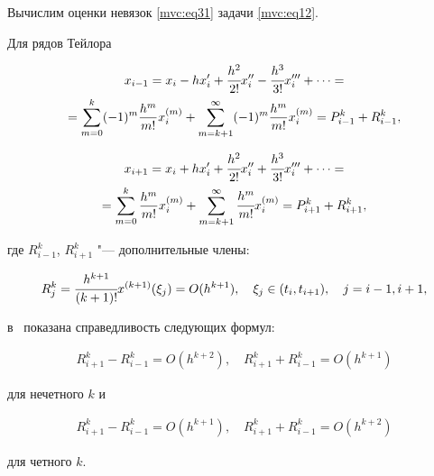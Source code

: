 Вычислим оценки невязок \eqref{mvc:eq31} задачи \eqref{mvc:eq12}.

Для рядов Тейлора

\begin{multline}

\label{mvc:eq47}

x_{i-1}=x_i-hx'_i+\cfrac{h^2}{2!} x''_i-\cfrac{h^3}{3!} x'''_i+\dots=

\\

= \sum_{m=0}^k(-1)^m\frac{h^m}{m!} x_i^{(m)}

+\sum_{m=k+1}^\infty (-1)^m\frac{h^m}{m!} x_i^{(m)}=P^k_{i-1}+R^k_{i-1},

\end{multline}

\begin{multline}

\label{mvc:eq48}

x_{i+1}=x_i+hx'_i+\cfrac{h^2}{2!} x''_i+\cfrac{h^3}{3!} x'''_i+\dots= \\ = \sum_{m=0}^k\frac{h^m}{m!} x_i^{(m)}+\sum_{m=k+1}^\infty \cfrac{h^m}{m!} x_i^{(m)}=P^k_{i+1}+R^k_{i+1},

\end{multline}

где $R^k_{i-1}$,  $R^k_{i+1}$ "--- дополнительные члены:

$$

R^k_{j} =\cfrac{h^{k+1}}{(k+1)!} x^{(k+1)}(\xi_j)=O(h^{k+1}),

\quad \xi_j \in (t_i,  t_{i+1}), \quad j = i-1, i+1,

$$ 

в~\cite{mc:bib2} показана справедливость следующих формул:

\begin{gather}

\label{mvc:eq49}

R^k_{i+1}-R^k_{i-1}=O(h^{k+2}),\quad R^k_{i+1}+R^k_{i-1}=O(h^{k+1})

\end{gather}

для нечетного $k$ и

\begin{gather}

\label{mvc:eq50}

R^k_{i+1}-R^k_{i-1}=O(h^{k+1}),\quad R^k_{i+1}+R^k_{i-1}=O(h^{k+2})

\end{gather}

для четного $k$.



